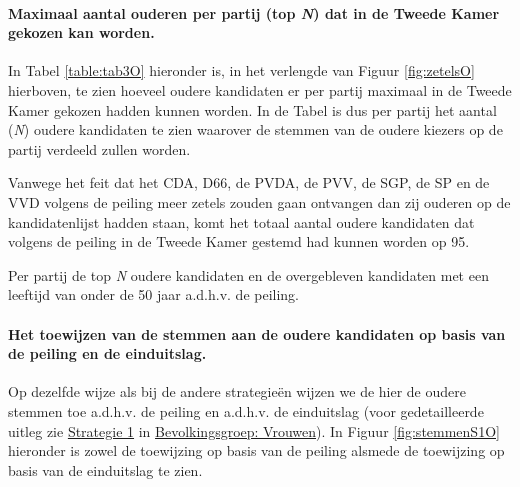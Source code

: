\paragraph{Maximaal aantal ouderen per partij (top \textit{N}) dat in de Tweede Kamer gekozen kan worden.}
In Tabel \ref{table:tab3O} hieronder is, in het verlengde van Figuur \ref{fig:zetelsO} hierboven, te zien hoeveel oudere kandidaten er per partij maximaal in de Tweede Kamer gekozen hadden kunnen worden. In de Tabel is dus per partij het aantal (\textit{N}) oudere kandidaten te zien waarover de stemmen van de oudere kiezers op de partij verdeeld zullen worden.  

Vanwege het feit dat het CDA, D66, de PVDA, de PVV, de SGP, de SP en de VVD volgens de peiling \cite{IPSOS} meer zetels zouden gaan ontvangen dan zij ouderen op de kandidatenlijst hadden staan, komt het totaal aantal oudere kandidaten dat volgens de peiling in de Tweede Kamer gestemd had kunnen worden op 95.




\begin{table}[h]
\centering
	\begin{footnotesize}
		
	\end{footnotesize}
			\caption{Per partij de top \textit{N} oudere kandidaten en de overgebleven kandidaten met een leeftijd van onder de 50 jaar a.d.h.v. de peiling.}
\label{table:tab3O} 
\end{table}



\paragraph{Het toewijzen van de stemmen aan de oudere kandidaten op basis van de peiling en de einduitslag.}
Op dezelfde wijze als bij de andere strategie\"{e}n wijzen we de hier de oudere stemmen toe a.d.h.v. de peiling en a.d.h.v. de einduitslag (voor gedetailleerde uitleg zie \hyperref[S1V]{Strategie 1} in \hyperref[vrouwen]{Bevolkingsgroep: Vrouwen}). In Figuur \ref{fig:stemmenS1O} hieronder is zowel de toewijzing op basis van de peiling alsmede de toewijzing op basis van de einduitslag te zien.



